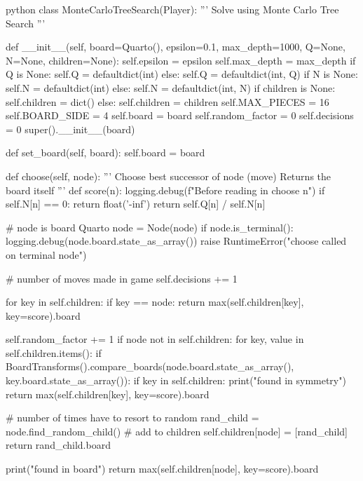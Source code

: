 \begin{mintedbox}{python}
class MonteCarloTreeSearch(Player):
    '''
    Solve using Monte Carlo Tree Search
    '''

    def __init__(self, board=Quarto(), epsilon=0.1, max_depth=1000, Q=None, N=None, children=None):
        self.epsilon = epsilon
        self.max_depth = max_depth
        if Q is None:
            self.Q = defaultdict(int)
        else:
            self.Q = defaultdict(int, Q)
        if N is None:
            self.N = defaultdict(int)
        else:
            self.N = defaultdict(int, N)
        if children is None:
            self.children = dict()
        else:
            self.children = children
        self.MAX_PIECES = 16
        self.BOARD_SIDE = 4
        self.board = board
        self.random_factor = 0
        self.decisions = 0
        super().__init__(board)

    def set_board(self, board):
        self.board = board

    def choose(self, node):
        '''
        Choose best successor of node (move)
        Returns the board itself
        '''
        def score(n):
            logging.debug(f"Before reading in choose {n}")
            if self.N[n] == 0:
                return float('-inf')
            return self.Q[n] / self.N[n]

        # node is board Quarto
        node = Node(node)
        if node.is_terminal():
            logging.debug(node.board.state_as_array())
            raise RuntimeError("choose called on terminal node")

        # number of moves made in game
        self.decisions += 1

        for key in self.children:
            if key == node:
                return max(self.children[key], key=score).board

        self.random_factor += 1
        if node not in self.children:
            for key, value in self.children.items():
                if BoardTransforms().compare_boards(node.board.state_as_array(), key.board.state_as_array()):
                    if key in self.children:
                        print("found in symmetry")
                        return max(self.children[key], key=score).board

            # number of times have to resort to random
            rand_child = node.find_random_child()
            # add to children
            self.children[node] = [rand_child]
            return rand_child.board

        print("found in board")
        return max(self.children[node], key=score).board


\end{mintedbox}
